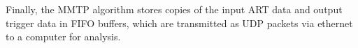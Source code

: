 Finally, the MMTP algorithm stores copies of the input ART data and output trigger data in FIFO buffers, which are transmitted as UDP packets via ethernet to a computer for analysis.

%
%

